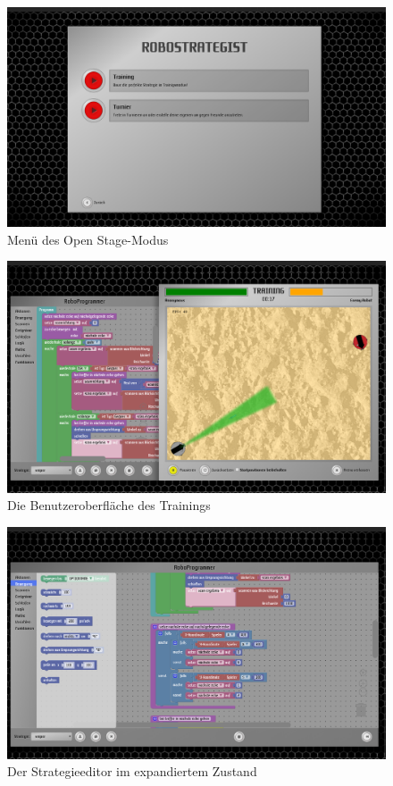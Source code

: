 \begin{figure}
  \centering
  \label{openstage-menu}
  \includegraphics[width=15cm, keepaspectratio]{figures/3-robostrategist-menu.png}
  \caption{Menü des Open Stage-Modus}
\end{figure}

\begin{figure}
  \centering
  \label{training}
  \includegraphics[width=15cm, keepaspectratio]{figures/3-training.png}
  \caption{Die Benutzeroberfläche des Trainings}
\end{figure}

\begin{figure}
  \centering
  \label{training-expanded}
  \includegraphics[width=15cm, keepaspectratio]{figures/4-training-expanded.png}
  \caption{Der Strategieeditor im expandiertem Zustand}
\end{figure}


